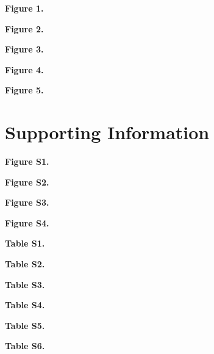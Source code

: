 \documentclass[10pt]{article}
\newcommand*{\commonDir}{./common/}    %
\begin{document}

\noindent\textbf{Figure 1.} 
\eeFBAfigOneCap

\hspace{1ex}

\noindent\textbf{Figure 2.} 
\eeFBAfigTwoCap

\hspace{1ex}

\noindent\textbf{Figure 3.} 
\eeFBAfigThreeCap

\hspace{1ex}

\noindent\textbf{Figure 4.}
\eeFBAfigFourCap

\hspace{1ex}

\noindent\textbf{Figure 5.}
\eeFBAfigFiveCap






\section{Supporting Information}

\noindent\textbf{Figure S1.} 
\eeFBAfigSOneCap

\hspace{1ex}

\noindent\textbf{Figure S2.} 
\eeFBAfigSTwoCap

\hspace{1ex}

\noindent\textbf{Figure S3.} 
\eeFBAfigSThreeCap

\hspace{1ex}

\noindent\textbf{Figure S4.}
\eeFBAfigSFourCap

\hspace{1ex}

\noindent\textbf{Table S1.} 
\eeFBATabSOneCap

\hspace{1ex}

\noindent\textbf{Table S2.} 
\eeFBATabSTwoCap

\hspace{1ex}

\noindent\textbf{Table S3.} 
\eeFBATabSThreeCap

\hspace{1ex}

\noindent\textbf{Table S4.}
\eeFBATabSFourCap

\hspace{1ex}

\noindent\textbf{Table S5.}
\eeFBATabSFiveCap

\hspace{1ex}

\noindent\textbf{Table S6.}
\eeFBATabSSixCap

\hspace{1ex}
\end{document}
